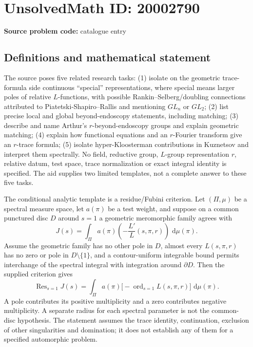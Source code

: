 \documentclass[11pt]{article}
\newcommand{\dd}{\,\mathrm{d}}
\begin{document}
\section*{UnsolvedMath ID: 20002790}
\textbf{Source problem code:} catalogue entry
\subsection{Definitions and mathematical statement}
The source poses five related research tasks: (1) isolate on the geometric trace-formula side continuous ``special'' representations, where special means larger poles of relative $L$-functions, with possible Rankin--Selberg/doubling connections attributed to Piatetski-Shapiro--Rallis and mentioning $GL_n$ or $GL_2$; (2) list precise local and global beyond-endoscopy statements, including matching; (3) describe and name Arthur's $r$-beyond-endoscopy groups and explain geometric matching; (4) explain how functional equations and an $r$-Fourier transform give an $r$-trace formula; (5) isolate hyper-Kloosterman contributions in Kuznetsov and interpret them spectrally. No field, reductive group, $L$-group representation $r$, relative datum, test space, trace normalization or exact integral identity is specified. The aid supplies two limited templates, not a complete answer to these five tasks.

The conditional analytic template is a residue/Fubini criterion. Let $(\Pi,\mu)$ be a spectral measure space, let $a(\pi)$ be a test weight, and suppose on a common punctured disc $D$ around $s=1$ a geometric meromorphic family agrees with
\[
J(s)=\int_\Pi a(\pi)\left(-\frac{L'}{L}(s,\pi,r)\right)\,\dd\mu(\pi).
\]
Assume the geometric family has no other pole in $D$, almost every $L(s,\pi,r)$ has no zero or pole in $D\setminus\{1\}$, and a contour-uniform integrable bound permits interchange of the spectral integral with integration around $\partial D$. Then the supplied criterion gives
\[
\operatorname{Res}_{s=1}J(s)
=\int_\Pi a(\pi)\bigl[-\operatorname{ord}_{s=1}L(s,\pi,r)\bigr]\,\dd\mu(\pi).
\]
A pole contributes its positive multiplicity and a zero contributes negative multiplicity. A separate radius for each spectral parameter is not the common-disc hypothesis. The statement assumes the trace identity, continuation, exclusion of other singularities and domination; it does not establish any of them for a specified automorphic problem.
\end{document}

